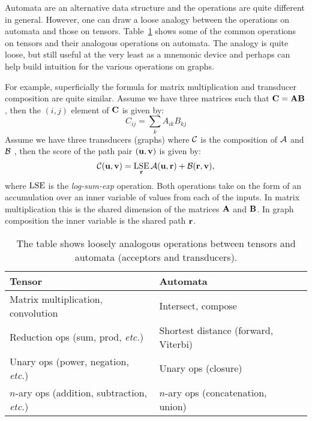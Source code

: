 Automata are an alternative data structure and the operations are quite
different in general. However, one can draw a loose analogy between the
operations on automata and those on tensors.
Table~\ref{tab:tensor_wfst_analogy} shows some of the common operations on
tensors and their analogous operations on automata. The analogy is quite loose,
but still useful at the very least as a mnemonic device and perhaps can help
build intuition for the various operations on graphs.

For example, superficially the formula for matrix multiplication and transducer
composition are quite similar. Assume we have three matrices such that ${\bf C} = {\bf A}
{\bf B}$, then the $(i, j)$ element of ${\bf C}$ is given by:
\begin{equation}
    C_{ij} = \sum_{k} A_{ik} B_{kj}
\end{equation}
Assume we have three transducers (graphs) where $\mathcal{C}$ is the composition of
$\mathcal{A}$ and $\mathcal{B}$ , then the score of the path pair $({\bf u}, {\bf v})$ is given by:
\begin{equation}
    \mathcal{C}({\bf u}, {\bf v}) = \operatorname*{\textrm{LSE}}_{{\bf r}} \mathcal{A}({\bf u}, {\bf r}) + \mathcal{B}({\bf r}, {\bf v}),
\end{equation}
where $\operatorname*{\textrm{LSE}}$ is the \emph{log-sum-exp} operation.
Both operations take on the form of an accumulation over an inner variable of
values from each of the inputs. In matrix multiplication this is the shared
dimension of the matrices ${\bf A}$ and ${\bf B}$. In graph composition the inner
variable is the shared path ${\bf r}$.

\begin{table}[ht]
    \renewcommand{\arraystretch}{1.4}
    \caption{The table shows loosely analogous operations between tensors and
    automata (acceptors and transducers).}
    \centering
    \begin{tabular}{l l l}
    \toprule
        Tensor & Automata \\
    \midrule
        Matrix multiplication, convolution & Intersect, compose \\
        \rowcolor{Gray} Reduction ops (sum, prod, \emph{etc.}) & Shortest distance (forward, Viterbi) \\
        Unary ops (power, negation, \emph{etc.})  & Unary ops (closure) \\
        \rowcolor{Gray} $n$-ary ops (addition, subtraction, \emph{etc.})  & $n$-ary ops (concatenation, union) \\
    \bottomrule
    \end{tabular}
    \label{tab:tensor_wfst_analogy}
\end{table}

